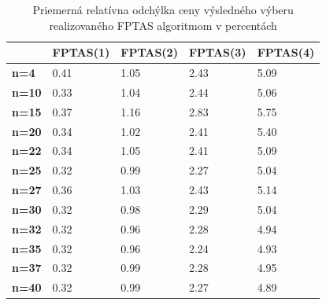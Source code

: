 \documentclass[slovak]{article}
\begin{document}
\begin{table}\centering
	\begin{tabularx}{\textwidth}{ | X | X | X | X | X |}
	  \hline                       
					& \textbf{FPTAS(1)} 	& \textbf{FPTAS(2)} & \textbf{FPTAS(3)} 	& \textbf{FPTAS(4)}\\ \hline
	  \textbf{n=4} 	& 0.41 					& 1.05 				&  2.43 				& 5.09	\\ \hline
	  \textbf{n=10} & 0.33 					& 1.04 				&  2.44 				& 5.06	\\ \hline
	  \textbf{n=15} & 0.37 					& 1.16 				&  2.83 				& 5.75	\\ \hline
	  \textbf{n=20} & 0.34 					& 1.02 				&  2.41 				& 5.40	\\ \hline
	  \textbf{n=22} & 0.34 					& 1.05 				&  2.41 				& 5.09	\\ \hline
	  \textbf{n=25} & 0.32 					& 0.99 				&  2.27 				& 5.04	\\ \hline
	  \textbf{n=27} & 0.36 					& 1.03 				&  2.43 				& 5.14	\\ \hline
	  \textbf{n=30} & 0.32 					& 0.98 				&  2.29 				& 5.04	\\ \hline
	  \textbf{n=32} & 0.32 					& 0.96 				&  2.28 				& 4.94	\\ \hline
	  \textbf{n=35} & 0.32 					& 0.96 				&  2.24 				& 4.93	\\ \hline
	  \textbf{n=37} & 0.32 					& 0.99 				&  2.28 				& 4.95	\\ \hline
	  \textbf{n=40} & 0.32 					& 0.99 				&  2.27 				& 4.89	\\ \hline
	\end{tabularx}
\caption{Priemerná relatívna odchýlka ceny výsledného výberu realizovaného FPTAS algoritmom v percentách}
\label{tab2}
\end{table}
\end{document}
